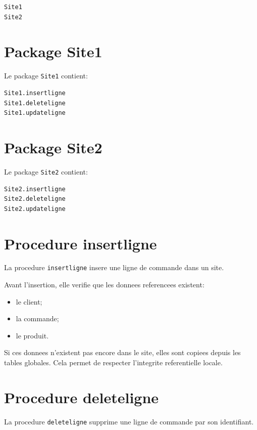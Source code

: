 \documentclass[12pt,a4paper]{report}
\begin{document}
\begin{lstlisting}[style=textstyle]
Site1
Site2
\end{lstlisting}

\section{Package Site1}

Le package \texttt{Site1} contient:

\begin{lstlisting}[style=textstyle]
Site1.insertligne
Site1.deleteligne
Site1.updateligne
\end{lstlisting}

\section{Package Site2}

Le package \texttt{Site2} contient:

\begin{lstlisting}[style=textstyle]
Site2.insertligne
Site2.deleteligne
Site2.updateligne
\end{lstlisting}

\section{Procedure insertligne}

La procedure \texttt{insertligne} insere une ligne de commande dans un site.

Avant l'insertion, elle verifie que les donnees referencees existent:

\begin{itemize}
    \item le client;
    \item la commande;
    \item le produit.
\end{itemize}

Si ces donnees n'existent pas encore dans le site, elles sont copiees depuis les tables globales. Cela permet de respecter l'integrite referentielle locale.

\section{Procedure deleteligne}

La procedure \texttt{deleteligne} supprime une ligne de commande par son identifiant.
\end{document}
